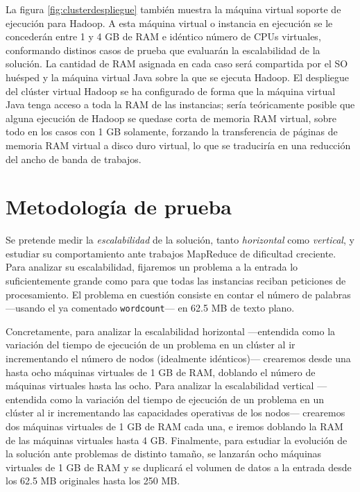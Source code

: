 La figura \ref{fig:clusterdespliegue} tambi\'en muestra la m\'aquina virtual soporte de ejecuci\'on para Hadoop. A esta m\'aquina virtual o instancia en ejecuci\'on se le conceder\'an entre 1 y 4 GB de RAM e id\'entico n\'umero de CPUs virtuales, conformando distinos casos de prueba que evaluar\'an la escalabilidad de la soluci\'on. La cantidad de RAM asignada en cada caso ser\'a compartida por el SO hu\'esped y la m\'aquina virtual Java sobre la que se ejecuta Hadoop. El des\-plie\-gue del cl\'uster virtual Hadoop se ha configurado de forma que la m\'aquina virtual Java tenga acceso a toda la RAM de las instancias; ser\'ia te\'oricamente posible que alguna ejecuci\'on de Hadoop se quedase corta de memoria RAM virtual, sobre todo en los casos con 1 GB solamente, forzando la transferencia de p\'aginas de memoria RAM virtual a disco duro virtual, lo que se traducir\'ia en una reducci\'on del ancho de banda de trabajos.

\section{Metodolog\'ia de prueba}\label{sec:metodologiaprueba}
\noindent Se pretende medir la \emph{escalabilidad} de la soluci\'on, tanto \emph{horizontal} como \emph{vertical}, y estudiar su comportamiento ante trabajos MapReduce de dificultad creciente. Para analizar su escalabilidad, fijaremos un problema a la entrada lo suficientemente grande como para que todas las instancias reciban peticiones de procesamiento. El problema en cuesti\'on consiste en contar el n\'umero de palabras ---usando el ya comentado \texttt{wordcount}--- en 62.5 MB de texto plano. \newline 

Concretamente, para analizar la escalabilidad horizontal ---entendida como la variaci\'on del tiempo de ejecuci\'on de un problema en un cl\'uster al ir incrementando el n\'umero de nodos (idealmente id\'enticos)--- crearemos desde una hasta ocho m\'aquinas virtuales de 1 GB de RAM, doblando el n\'umero de m\'aquinas virtuales hasta las ocho. Para analizar la escalabilidad vertical ---entendida como la variaci\'on del tiempo de ejecuci\'on de un problema en un cl\'uster al ir incrementando las capacidades operativas de los nodos--- crearemos dos m\'aquinas virtuales de 1 GB de RAM cada una, e iremos doblando la RAM de las m\'aquinas virtuales hasta 4 GB. Finalmente, para estudiar la evoluci\'on de la soluci\'on ante problemas de distinto tama\~no, se lanzar\'an ocho m\'aquinas virtuales de 1 GB de RAM y se duplicar\'a el volumen de datos a la entrada desde los 62.5 MB originales hasta los 250 MB.\newline

